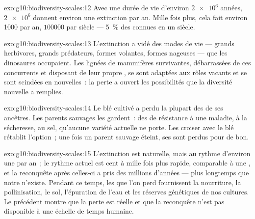 \begin{solution}{exo:g10:biodiversity-scales:12}
Avec une durée de vie d'environ $\num{2e6}$ années, $\num{2e6}$
 donnent environ une extinction par an. Mille fois plus, cela
fait environ 1000  par an, $\num{100000}$ par siècle --- 5~\%
des  connues en un siècle.
\end{solution}

\begin{solution}{exo:g10:biodiversity-scales:13}
L'extinction a vidé des modes de vie --- grands herbivores, grands
prédateurs, formes volantes, formes nageuses --- que les dinosaures
occupaient. Les lignées de mammifères survivantes, débarrassées de ces
concurrents et disposant de leur propre , se sont
adaptées aux rôles vacants et se sont scindées en  nouvelles~:
la perte a ouvert les possibilités que la diversité nouvelle a
remplies.
\end{solution}

\begin{solution}{exo:g10:biodiversity-scales:14}
Le blé cultivé a perdu la plupart des  de ses ancêtres. Les
parents sauvages les gardent~: des  de résistance à une maladie,
à la sécheresse, au sel, qu'aucune variété actuelle ne porte. Les
croiser avec le blé rétablit l'option~; une fois un parent sauvage
éteint, ses  sont perdus pour de bon.
\end{solution}

\begin{solution}{exo:g10:biodiversity-scales:15}
L'extinction est naturelle, mais au rythme d'environ une  par
an~; le rythme actuel est cent à mille fois plus rapide, comparable à
une , et la reconquête après celles-ci a pris des
millions d'années --- plus longtemps que notre  n'existe.
Pendant ce temps, les  que l'on perd fournissent la
nourriture, la pollinisation, le sol, l'épuration de l'eau et les
réserves génétiques de nos cultures. Le précédent montre que la perte
est réelle et que la reconquête n'est pas disponible à une échelle de
temps humaine.
\end{solution}

